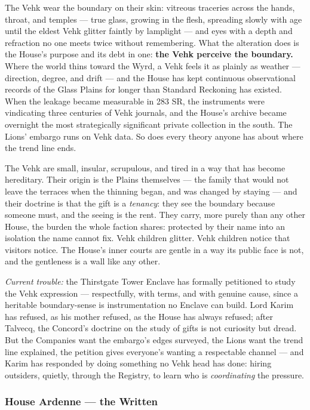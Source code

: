 The Vehk wear the boundary on their skin: vitreous traceries across the hands, throat, and temples --- true glass, growing in the flesh, spreading slowly with age until the eldest Vehk glitter faintly by lamplight --- and eyes with a depth and refraction no one meets twice without remembering. What the alteration does is the House's purpose and its debt in one: \textbf{the Vehk perceive the boundary.} Where the world thins toward the Wyrd, a Vehk feels it as plainly as weather --- direction, degree, and drift --- and the House has kept continuous observational records of the Glass Plains for longer than Standard Reckoning has existed. When the leakage became measurable in 283 SR, the instruments were vindicating three centuries of Vehk journals, and the House's archive became overnight the most strategically significant private collection in the south. The Lions' embargo runs on Vehk data. So does every theory anyone has about where the trend line ends.

The Vehk are small, insular, scrupulous, and tired in a way that has become hereditary. Their origin is the Plains themselves --- the family that would not leave the terraces when the thinning began, and was changed by staying --- and their doctrine is that the gift is a \textit{tenancy}: they see the boundary because someone must, and the seeing is the rent. They carry, more purely than any other House, the burden the whole faction shares: protected by their name into an isolation the name cannot fix. Vehk children glitter. Vehk children notice that visitors notice. The House's inner courts are gentle in a way its public face is not, and the gentleness is a wall like any other.

\textit{Current trouble:} the Thirstgate Tower Enclave has formally petitioned to study the Vehk expression --- respectfully, with terms, and with genuine cause, since a heritable boundary-sense is instrumentation no Enclave can build. Lord Karim has refused, as his mother refused, as the House has always refused; after Talvecq, the Concord's doctrine on the study of gifts is not curiosity but dread. But the Companies want the embargo's edges surveyed, the Lions want the trend line explained, the petition gives everyone's wanting a respectable channel --- and Karim has responded by doing something no Vehk head has done: hiring outsiders, quietly, through the Registry, to learn who is \textit{coordinating} the pressure.

\subsubsection{House Ardenne --- the Written}

